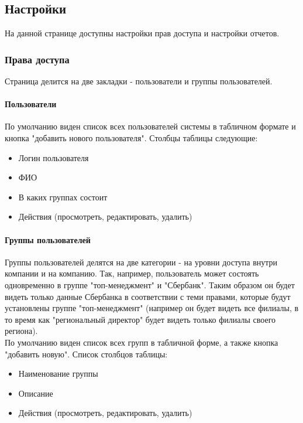 \documentclass[DIV=calc, paper=a4, fontsize=11pt]{scrartcl} %
\begin{document}
\subsection{Настройки}

На данной странице доступны настройки прав доступа и настройки отчетов.

\subsubsection{Права доступа}

Страница делится на две закладки - пользователи и группы пользователей.

\paragraph{Пользователи}

По умолчанию виден список всех пользователей системы в табличном формате и кнопка "добавить нового пользователя". Столбцы таблицы следующие:

\begin{itemize}
	\item Логин пользователя
	\item ФИО
	\item В каких группах состоит
	\item Действия (просмотреть, редактировать, удалить)
\end{itemize}

\paragraph{Группы пользователей}
Группы пользователей делятся на две категории - на уровни доступа внутри компании и на компанию. Так, например, пользователь может состоять одновременно в группе "топ-менеджмент" и "Сбербанк". Таким образом он будет видеть только данные Сбербанка в соответствии с теми правами, которые будут установлены группе "топ-менеджмент" (например он будет видеть все филиалы, в то время как "региональный директор" будет видеть только филиалы своего региона).
\\[0.5cm]
По умолчанию виден список всех групп в табличной форме, а также кнопка "добавить новую". Список столбцов таблицы:

\begin{itemize}
	\item Наименование группы
	\item Описание
	\item Действия (просмотреть, редактировать, удалить)
\end{itemize}
\end{document}
